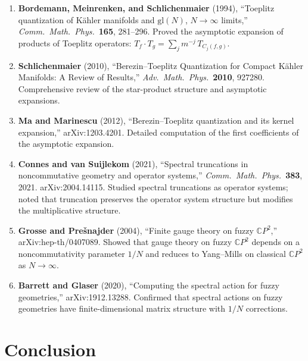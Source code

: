 \documentclass[12pt,a4paper]{article}
\theoremstyle{definition}
\begin{document}
\begin{enumerate}
\item \textbf{Bordemann, Meinrenken, and Schlichenmaier} (1994),
  ``Toeplitz quantization of K\"ahler manifolds and $\mathrm{gl}(N)$,
  $N \to \infty$ limits,'' \textit{Comm.\ Math.\ Phys.}\ \textbf{165},
  281--296.  Proved the asymptotic expansion of products of Toeplitz
  operators: $T_f \cdot T_g = \sum_{j} m^{-j}\,T_{C_j(f,g)}$.

\item \textbf{Schlichenmaier} (2010), ``Berezin--Toeplitz Quantization
  for Compact K\"ahler Manifolds: A Review of Results,''
  \textit{Adv.\ Math.\ Phys.}\ \textbf{2010}, 927280.
  Comprehensive review of the star-product structure and asymptotic
  expansions.

\item \textbf{Ma and Marinescu} (2012), ``Berezin--Toeplitz
  quantization and its kernel expansion,'' arXiv:1203.4201.
  Detailed computation of the first coefficients of the asymptotic
  expansion.

\item \textbf{Connes and van Suijlekom} (2021), ``Spectral truncations
  in noncommutative geometry and operator systems,''
  \textit{Comm.\ Math.\ Phys.}\ \textbf{383}, 2021.
  arXiv:2004.14115.  Studied spectral truncations as operator systems;
  noted that truncation preserves the operator system structure but
  modifies the multiplicative structure.

\item \textbf{Grosse and Pre\v{s}najder} (2004), ``Finite gauge theory
  on fuzzy $\mathbb{C}P^2$,'' arXiv:hep-th/0407089.
  Showed that gauge theory on fuzzy $\mathbb{C}P^2$ depends on a
  noncommutativity parameter $1/N$ and reduces to Yang--Mills on
  classical $\mathbb{C}P^2$ as $N \to \infty$.

\item \textbf{Barrett and Glaser} (2020), ``Computing the spectral
  action for fuzzy geometries,'' arXiv:1912.13288.
  Confirmed that spectral actions on fuzzy geometries have
  finite-dimensional matrix structure with $1/N$ corrections.
\end{enumerate}

\section{Conclusion}
\label{sec:conclusion}
\end{document}
